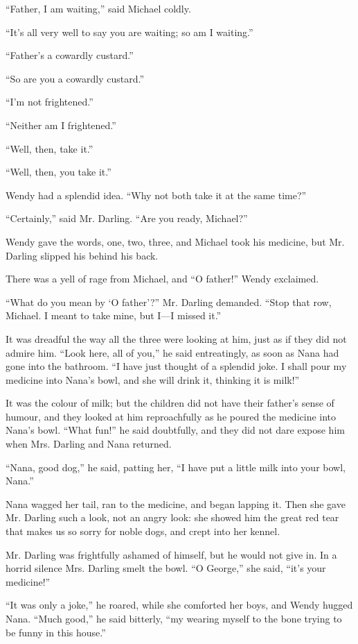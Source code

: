 ``Father, I am waiting,'' said Michael coldly.

``It's all very well to say you are waiting; so am I waiting.''

``Father's a cowardly custard.''

``So are you a cowardly custard.''

``I'm not frightened.''

``Neither am I frightened.''

``Well, then, take it.''

``Well, then, you take it.''

Wendy had a splendid idea.
``Why not both take it at the same time?''

``Certainly,'' said Mr. Darling.
``Are you ready, Michael?''

Wendy gave the words, one, two, three, and Michael took his medicine, but Mr.
Darling slipped his behind his back.

There was a yell of rage from Michael, and ``O father!'' Wendy exclaimed.

``What do you mean by `O father'?'' Mr. Darling demanded. ``Stop that row,
Michael. I meant to take mine, but I—I missed it.''

It was dreadful the way all the three were looking at him, just as if they did
not admire him.
``Look here, all of you,'' he said entreatingly, as soon as Nana had gone into
the bathroom.
``I have just thought of a splendid joke.
I shall pour my medicine into Nana's bowl, and she will drink it, thinking it is
milk!''

It was the colour of milk; but the children did not have their father's sense of
humour, and they looked at him reproachfully as he poured the medicine into
Nana's bowl.
``What fun!'' he said doubtfully, and they did not dare expose him when
Mrs. Darling and Nana returned.

``Nana, good dog,'' he said, patting her, ``I have put a little milk into your
bowl, Nana.''

Nana wagged her tail, ran to the medicine, and began lapping it.
Then she gave Mr. Darling such a look, not an angry look: she showed him the
great red tear that makes us so sorry for noble dogs, and crept into her kennel.

Mr. Darling was frightfully ashamed of himself, but he would not give in.
In a horrid silence Mrs. Darling smelt the bowl.
``O George,'' she said, ``it's your medicine!''

``It was only a joke,'' he roared, while she comforted her boys, and Wendy
hugged Nana.
``Much good,'' he said bitterly, ``my wearing myself to the bone trying to be
funny in this house.''

